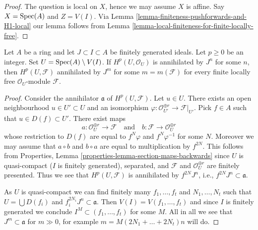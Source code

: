 \begin{proof}
The question is local on $X$, hence we may assume $X$ is affine.
Say $X = \mathop{\mathrm{Spec}}(A)$ and $Z = V(I)$. Via
Lemma \ref{lemma-finiteness-pushforwards-and-H1-local}
our lemma follows from
Lemma \ref{lemma-local-finiteness-for-finite-locally-free}.
\end{proof}

\begin{lemma}
\label{lemma-annihilate-Hp}
\begin{reference}
\cite[Lemma 1.9]{Bhatt-local}
\end{reference}
Let $A$ be a ring and let $J \subset I \subset A$ be finitely generated ideals.
Let $p \geq 0$ be an integer. Set $U = \mathop{\mathrm{Spec}}(A) \setminus V(I)$. If
$H^p(U, \mathcal{O}_U)$ is annihilated by $J^n$ for some $n$, then
$H^p(U, \mathcal{F})$ annihilated by $J^m$ for some $m = m(\mathcal{F})$
for every finite locally free $\mathcal{O}_U$-module $\mathcal{F}$.
\end{lemma}

\begin{proof}
Consider the annihilator $\mathfrak a$ of $H^p(U, \mathcal{F})$.
Let $u \in U$. There exists an open neighbourhood $u \in U' \subset U$
and an isomorphism
$\varphi : \mathcal{O}_{U'}^{\oplus r} \to \mathcal{F}|_{U'}$.
Pick $f \in A$ such that $u \in D(f) \subset U'$.
There exist maps
$$
a : \mathcal{O}_U^{\oplus r} \longrightarrow \mathcal{F}
\quad\text{and}\quad
b : \mathcal{F} \longrightarrow \mathcal{O}_U^{\oplus r}
$$
whose restriction to $D(f)$ are equal to $f^N \varphi$
and $f^N \varphi^{-1}$ for some $N$. Moreover we may assume that
$a \circ b$ and $b \circ a$ are equal to multiplication by $f^{2N}$.
This follows from Properties, Lemma
\ref{properties-lemma-section-maps-backwards}
since $U$ is quasi-compact ($I$ is finitely generated), separated, and
$\mathcal{F}$ and $\mathcal{O}_U^{\oplus r}$ are finitely presented.
Thus we see that $H^p(U, \mathcal{F})$ is annihilated by
$f^{2N}J^n$, i.e., $f^{2N}J^n \subset \mathfrak a$.

\medskip\noindent
As $U$ is quasi-compact we can find finitely many $f_1, \ldots, f_t$
and $N_1, \ldots, N_t$ such that $U = \bigcup D(f_i)$ and
$f_i^{2N_i}J^n \subset \mathfrak a$. Then $V(I) = V(f_1, \ldots, f_t)$
and since $I$ is finitely generated we conclude
$I^M \subset (f_1, \ldots, f_t)$ for some $M$.
All in all we see that $J^m \subset \mathfrak a$ for
$m \gg 0$, for example $m = M (2N_1 + \ldots + 2N_t) n$  will do.
\end{proof}











